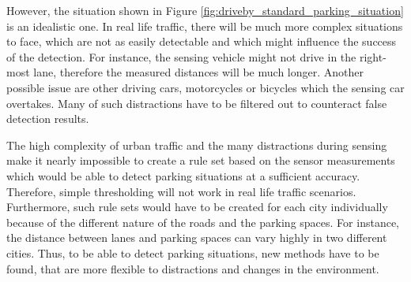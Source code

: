 However, the situation shown in Figure \ref{fig:driveby_standard_parking_situation} is an idealistic one. In real life traffic, there will be much more complex situations to face, which are not as easily detectable and which might influence the success of the detection. For instance, the sensing vehicle might not drive in the right-most lane, therefore the measured distances will be much longer. Another possible issue are other driving cars, motorcycles or bicycles which the sensing car overtakes. Many of such distractions have to be filtered out to counteract false detection results.

The high complexity of urban traffic and the many distractions during sensing make it nearly impossible to create a rule set based on the sensor measurements which would be able to detect parking situations at a sufficient accuracy. Therefore, simple thresholding will not work in real life traffic scenarios. Furthermore, such rule sets would have to be created for each city individually because of the different nature of the roads and the parking spaces. For instance, the distance between lanes and parking spaces can vary highly in two different cities. Thus, to be able to detect parking situations, new methods have to be found, that are more flexible to distractions and changes in the environment.







